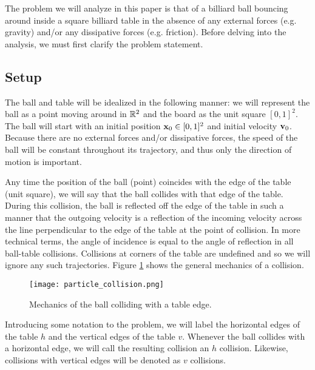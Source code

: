 
The problem we will analyze in this paper is that of a billiard ball bouncing around inside a square billiard table in the absence of any external forces (e.g. gravity) and/or any dissipative forces (e.g. friction). Before delving into the analysis, we must first clarify the problem statement.

\subsection{Setup}

The ball and table will be idealized in the following manner: we will represent the ball as a point moving around in $\mathbb R^2$ and the board as the unit square $[0,1]^2$. The ball will start with an initial position $\mathbf{x}_0 \in [0,1]^2$ and initial velocity $\mathbf{v}_0$. Because there are no external forces and/or dissipative forces, the speed of the ball will be constant throughout its trajectory, and thus only the direction of motion is important.

Any time the position of the ball (point) coincides with the edge of the table (unit square), we will say that the ball collides with that edge of the table. During this collision, the ball is reflected off the edge of the table in such a manner that the outgoing velocity is a reflection of the incoming velocity across the line perpendicular to the edge of the table at the point of collision. In more technical terms, the angle of incidence is equal to the angle of reflection in all ball-table collisions. Collisions at corners of the table are undefined and so we will ignore any such trajectories. Figure \ref{fig:collision-angle} shows the general mechanics of a collision.

\begin{figure}[H]
  \begin{center}
    \texttt{[image: particle\_collision.png]}
  \end{center}
  \vspace{-.2in} %
  \caption{\label{fig:collision-angle}Mechanics of the ball colliding with a table edge.}
\end{figure}

Introducing some notation to the problem, we will label the horizontal edges of the table $h$ and the vertical edges of the table $v$. Whenever the ball collides with a horizontal edge, we will call the resulting collision an $h$ collision. Likewise, collisions with vertical edges will be denoted as $v$ collisions.

